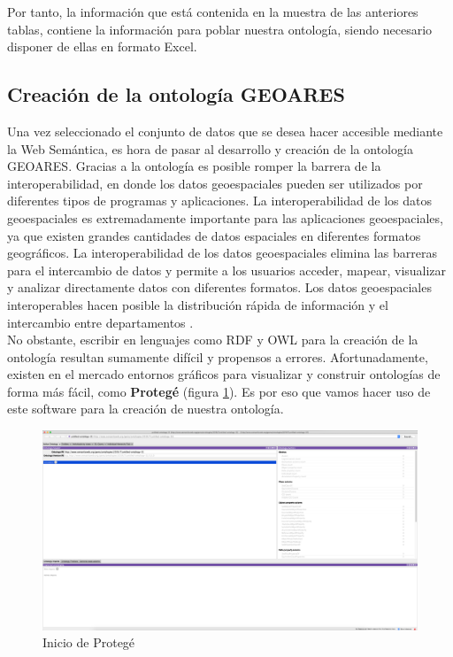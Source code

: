 Por tanto, la información que está contenida en la muestra de las anteriores tablas, contiene la información para poblar nuestra ontología, siendo necesario disponer de ellas en formato Excel.




\subsection{Creación de la ontología GEOARES}

Una vez seleccionado el conjunto de datos que se desea hacer accesible mediante la Web Semántica, es hora de pasar al desarrollo y creación de la ontología GEOARES. Gracias a la ontología es posible romper la barrera de la interoperabilidad, en donde los datos geoespaciales pueden ser utilizados por diferentes tipos de programas y aplicaciones. La interoperabilidad de los datos geoespaciales es extremadamente importante para las aplicaciones geoespaciales, ya que existen grandes cantidades de datos espaciales en diferentes formatos geográficos. La interoperabilidad de los datos geoespaciales elimina las barreras para el intercambio de datos y permite a los usuarios acceder, mapear, visualizar y analizar directamente datos con diferentes formatos. Los datos geoespaciales interoperables hacen posible la distribución rápida de información y el intercambio entre departamentos \cite{libro-gis}.\\

No obstante, escribir en lenguajes como RDF y OWL para la creación de la ontología resultan sumamente difícil y propensos a errores. Afortunadamente, existen en el mercado entornos gráficos para visualizar y construir ontologías de forma más fácil, como \textbf{Protegé} (figura \ref{fig:protege}). Es por eso que vamos hacer uso de este software para la creación de nuestra ontología.

\begin{figure}[H]
	\centering
	\includegraphics[width=1\linewidth]{imagenes/capitulo5/protege}
	\caption{Inicio de Protegé}
	\label{fig:protege}
\end{figure}

